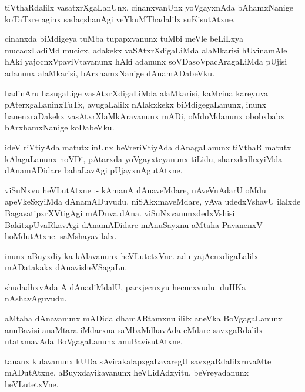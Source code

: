\documentclass{article}
\begin{document}
\begin{mn}
tiVthaRdalilx vasatxrXgaLanUnx, cinanxvanUnx  yoVgayxnAda bAhamxNanige koTaTxre 
aginx sadaqshanAgi veYkuMThadalilx suKisutAtxne.
\end{mn}

\begin{mn}
cinanxda biMdigeya tuMba tupapxvanunx tuMbi meVle beLiLxya mucacxLadiMd mucicx, 
adakekx vaSAtxrXdigaLiMda alaMkarisi hUvinamAle hAki yajocnxVpaviVtavanunx  hAki  
adanunx  soVDasoVpacAragaLiMda  pUjisi adanunx alaMkarisi, bArxhamxNanige dAnamADabeVku.
\end{mn}

\begin{mn}
hadinAru hasugaLige vasAtxrXdigaLiMda alaMkarisi,  kaMcina kareyuva pAterxgaLaninxTuTx,  
avugaLalilx nAlakxkekx biMdigegaLanunx, inunx hanenxraDakekx vasAtxrXlaMkAravanunx  mADi,  
oMdoMdanunx obobxbabx bArxhamxNanige koDabeVku.
\end{mn}

\begin{mn}
ideV riVtiyAda matutx inUnx beVreriVtiyAda dAnagaLanunx tiVthaR matutx kAlagaLanunx  
noVDi, pAtarxda  yoVgayxteyanunx  tiLidu,  sharxdedhxyiMda dAnamADidare bahaLavAgi pUjayxnAgutAtxne.
\end{mn}

\begin{mn}
viSuNxvu heVLutAtxne :- kAmanA dAnaveMdare,  nAveVnAdarU  oMdu apeVkeSxyiMda
 dAnamADuvudu. niSAkxmaveMdare,  yAva udedxVshavU ilalxde BagavatipxrXVtigAgi 
 mADuva dAna.  viSuNxvanunxdedxVshisi BakitxpUvaRkavAgi dAnamADidare mAnuSayxnu 
 aMtaha PavanenxV  hoMdutAtxne. saMshayavilalx.
\end{mn}

\begin{mn}
inunx aBuyxdiyika kAlavanunx  heVLutetxVne.  adu yajAcnxdigaLalilx mADatakakx  dAnavisheVSagaLu.
\end{mn}

\begin{mn}
shudadhxvAda A dAnadiMdalU,  parxjecnxyu hecucxvudu.  duHKa nAshavAguvudu.
\end{mn}

\begin{mn}
aMtaha dAnavanunx mADida dhamARtamxnu ililx aneVka BoVgagaLanunx anuBavisi anaMtara 
iMdarxna saMbaMdhavAda eMdare savxgaRdalilx utatxmavAda BoVgagaLanunx anuBavisutAtxne.
\end{mn}

\begin{mn}
tananx kulavanunx kUDa sAvirakalapxgaLavaregU  savxgaRdalilxruvaMte mADutAtxne.  
aBuyxdayikavanunx heVLidAdxyitu.  beVreyadanunx heVLutetxVne.
\end{mn}
\end{document}
